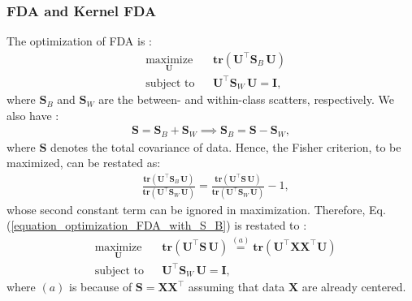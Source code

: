 \documentclass[lang=cn,10pt]{gorgeousnbook}
\numberwithin{equation}{section}%
\numberwithin{figure}{section}%
\begin{document}
\subsubsection{FDA and Kernel FDA}

The optimization of FDA is \cite{ghojogh2019fisher,fisher1936use}:
\begin{equation}\label{equation_optimization_FDA_with_S_B}
\begin{aligned}
& \underset{\boldsymbol{U}}{\text{maximize}}
& & \textbf{tr}(\boldsymbol{U}^\top \boldsymbol{S}_B\, \boldsymbol{U}) \\
& \text{subject to}
& & \boldsymbol{U}^\top \boldsymbol{S}_W\, \boldsymbol{U} = \boldsymbol{I},
\end{aligned}
\end{equation}
where $\boldsymbol{S}_B$ and $\boldsymbol{S}_W$ are the between- and within-class scatters, respectively. 
We also have \cite{ye2007least}: 
\begin{align}\label{equation_S_T_as_sum_of_scatters}
\boldsymbol{S} = \boldsymbol{S}_B + \boldsymbol{S}_W \implies \boldsymbol{S}_B = \boldsymbol{S} - \boldsymbol{S}_W,
\end{align}
where $\boldsymbol{S}$ denotes the total covariance of data. Hence, the Fisher criterion, to be maximized, can be restated as:
\begin{align}\label{equation_Fisher_criterion}
& \frac{\textbf{tr}(\boldsymbol{U}^\top \boldsymbol{S}_B\, \boldsymbol{U})}{\textbf{tr}(\boldsymbol{U}^\top \boldsymbol{S}_W\, \boldsymbol{U})} = \frac{\textbf{tr}(\boldsymbol{U}^\top \boldsymbol{S}\, \boldsymbol{U})}{\textbf{tr}(\boldsymbol{U}^\top \boldsymbol{S}_W\, \boldsymbol{U})} - 1,
\end{align}
whose second constant term can be ignored in maximization. Therefore, Eq. (\ref{equation_optimization_FDA_with_S_B}) is restated to \cite{yan2005graph,ghojogh2020generalized}:
\begin{equation}\label{equation_optimization_FDA_with_S_T}
\begin{aligned}
& \underset{\boldsymbol{U}}{\text{maximize}}
& & \textbf{tr}(\boldsymbol{U}^\top \boldsymbol{S}\, \boldsymbol{U}) \overset{(a)}{=} \textbf{tr}(\boldsymbol{U}^\top \boldsymbol{X} \boldsymbol{X}^\top \boldsymbol{U}) \\
& \text{subject to}
& & \boldsymbol{U}^\top \boldsymbol{S}_W\, \boldsymbol{U} = \boldsymbol{I},
\end{aligned}
\end{equation}
where $(a)$ is because of $\boldsymbol{S} = \boldsymbol{X} \boldsymbol{X}^\top$ assuming that data $\boldsymbol{X}$ are already centered. 
\end{document}
